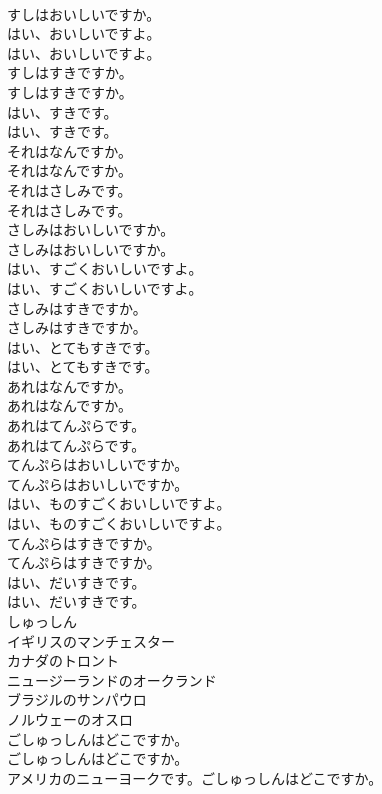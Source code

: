 \documentclass[8pt]{extreport}
\begin{document}
\begin{CJK}{UTF8}{min}
\\	すしはおいしいですか。 
\\	はい、おいしいですよ。	
\\	はい、おいしいですよ。 
\\	すしはすきですか。	
\\	すしはすきですか。 
\\	はい、すきです。	
\\	はい、すきです。 
\\	それはなんですか。	
\\	それはなんですか。 
\\	それはさしみです。	
\\	それはさしみです。 
\\	さしみはおいしいですか。	
\\	さしみはおいしいですか。 
\\	はい、すごくおいしいですよ。	
\\	はい、すごくおいしいですよ。 
\\	さしみはすきですか。	
\\	さしみはすきですか。 
\\	はい、とてもすきです。	
\\	はい、とてもすきです。 
\\	あれはなんですか。	
\\	あれはなんですか。 
\\	あれはてんぷらです。	
\\	あれはてんぷらです。 
\\	てんぷらはおいしいですか。	
\\	てんぷらはおいしいですか。 
\\	はい、ものすごくおいしいですよ。	
\\	はい、ものすごくおいしいですよ。 
\\	てんぷらはすきですか。	
\\	てんぷらはすきですか。 
\\	はい、だいすきです。	
\\	はい、だいすきです。 
\\	しゅっしん
\\	イギリスのマンチェスター
\\	カナダのトロント
\\	ニュージーランドのオークランド
\\	ブラジルのサンパウロ
\\	ノルウェーのオスロ
\\	ごしゅっしんはどこですか。	
\\	ごしゅっしんはどこですか。 
\\	アメリカのニューヨークです。ごしゅっしんはどこですか。	

\end{CJK}
\end{document}
